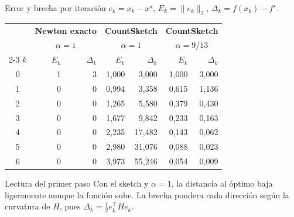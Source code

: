 \documentclass[aspectratio=169,11pt]{beamer}
\begin{document}
\begin{frame}{Error y brecha por iteración}
    \centering
    $e_k=x_k-x^\star$, \qquad $E_k=\|e_k\|_2$, \qquad $\Delta_k=f(x_k)-f^\star$.

    \medskip
    \small
    \setlength{\tabcolsep}{4pt}
    \renewcommand{\arraystretch}{1.06}
    \begin{tabular}{c rr rr rr}
        \hline
        & \multicolumn{2}{c}{\textbf{Newton exacto}}
        & \multicolumn{2}{c}{\textbf{CountSketch}}
        & \multicolumn{2}{c}{\textbf{CountSketch}}\\
        & \multicolumn{2}{c}{$\alpha=1$}
        & \multicolumn{2}{c}{$\alpha=1$}
        & \multicolumn{2}{c}{$\alpha=9/13$}\\
        \cline{2-3}\cline{4-5}\cline{6-7}
        $k$ & $E_k$ & $\Delta_k$ & $E_k$ & $\Delta_k$ & $E_k$ & $\Delta_k$\\
        \hline
        0 & 1 & 3 & 1,000 &  3,000 & 1,000 & 3,000\\
        1 & 0 & 0 & 0,994 &  3,358 & 0,615 & 1,136\\
        2 & 0 & 0 & 1,265 &  5,580 & 0,379 & 0,430\\
        3 & 0 & 0 & 1,677 &  9,842 & 0,233 & 0,163\\
        4 & 0 & 0 & 2,235 & 17,482 & 0,143 & 0,062\\
        5 & 0 & 0 & 2,980 & 31,076 & 0,088 & 0,023\\
        6 & 0 & 0 & 3,973 & 55,246 & 0,054 & 0,009\\
        \hline
    \end{tabular}

    \begin{block}{Lectura del primer paso}
        Con el sketch y $\alpha=1$, la distancia al óptimo baja ligeramente
        aunque la función sube. La brecha pondera cada dirección según
        la curvatura de $H$, pues $\Delta_k=\tfrac12 e_k^\top H e_k$.
    \end{block}
\end{frame}
\end{document}
